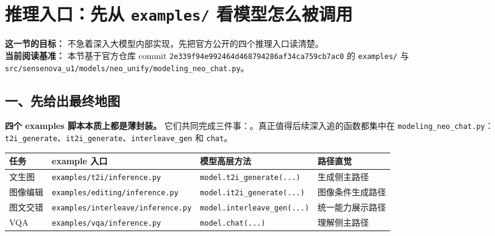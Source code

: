 
\section{推理入口：先从 \texttt{examples/} 看模型怎么被调用}

\begin{conceptbox}
\textbf{这一节的目标：} 不急着深入大模型内部实现，先把官方公开的四个推理入口读清楚。\\
\textbf{当前阅读基准：} 本节基于官方仓库 commit \texttt{2e339f94e992464d468794286af34ca759cb7ac0} 的 \texttt{examples/} 与 \texttt{src/sensenova\_u1/models/neo\_unify/modeling\_neo\_chat.py}。
\end{conceptbox}

\subsection{一、先给出最终地图}

\begin{summarybox}
\textbf{四个 examples 脚本本质上都是薄封装。} 它们共同完成三件事：。真正值得后续深入追的函数都集中在 \texttt{modeling\_neo\_chat.py}：\texttt{t2i\_generate}、\texttt{it2i\_generate}、\texttt{interleave\_gen} 和 \texttt{chat}。
\end{summarybox}

\begin{center}
{\small
\begin{tabular}{p{3.0cm}p{4.0cm}p{4.0cm}p{3.2cm}}
\hline
\textbf{任务} & \textbf{example 入口} & \textbf{模型高层方法} & \textbf{路径直觉} \\
\hline
文生图 & \texttt{examples/t2i/inference.py} & \texttt{model.t2i\_generate(...)} & 生成侧主路径 \\
图像编辑 & \texttt{examples/editing/inference.py} & \texttt{model.it2i\_generate(...)} & 图像条件生成路径 \\
图文交错 & \texttt{examples/interleave/inference.py} & \texttt{model.interleave\_gen(...)} & 统一能力展示路径 \\
VQA & \texttt{examples/vqa/inference.py} & \texttt{model.chat(...)} & 理解侧主路径 \\
\hline
\end{tabular}
}
\end{center}

